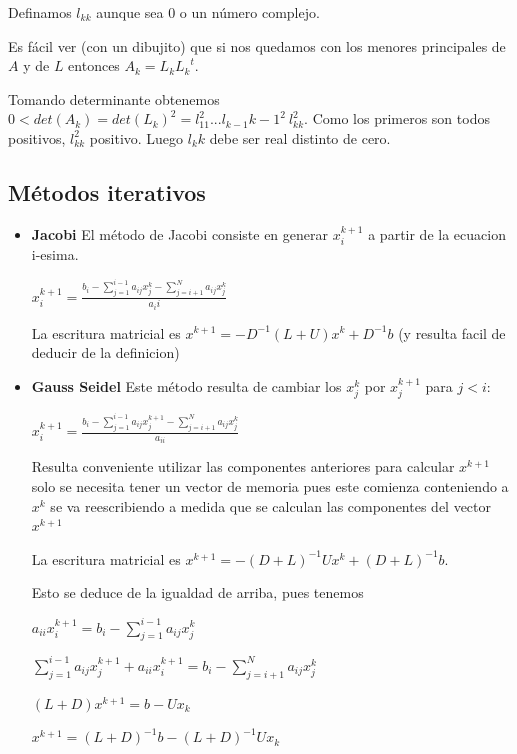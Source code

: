 \documentclass[10pt,a4paper,final]{report}
\begin{document}

Definamos $l_{kk}$ aunque sea $0$ o un número complejo.

Es fácil ver (con un dibujito) que si nos quedamos con los menores principales de $A$ y de $L$ entonces $A_k = L_k {L_k}^t$.


Tomando determinante obtenemos $0<det(A_k) = det(L_k)^2 = l_{11}^2...l_{k-1}{k-1}^2\ l_{kk}^2$. Como los primeros son todos positivos, $l_{kk}^2$ positivo. Luego $l_kk$ debe ser real distinto de cero.



\subsection{Métodos iterativos}


\begin{itemize}
    \item \textbf{Jacobi}
El método de Jacobi consiste en generar $x_{i}^{k+1}$ a partir de la ecuacion i-esima.


$x_i^{k+1} = \frac{b_i- \displaystyle \sum_{j=1}^{i-1}a_{ij}x_j^k - \displaystyle \sum_{j={i+1}}^{N}a_{ij}x_j^k }{a_ii}$

La escritura matricial es $x^{k+1}=-D^{-1}(L+U)x^k + D^{-1} b$ (y resulta facil de deducir de la definicion)

\item \textbf{Gauss Seidel} Este método resulta de cambiar los $x_j^k$ por $x_j^{k+1}$ para $j<i$:


$x_i^{k+1} = \frac{b_i- \displaystyle \sum_{j=1}^{i-1}a_{ij}x_j^{k+1} - \displaystyle \sum_{j={i+1}}^{N}a_{ij}x_j^{k} }{a_{ii}}$

Resulta conveniente utilizar las componentes anteriores para calcular $x^{k+1}$ solo se necesita tener un vector de memoria pues este comienza conteniendo a $x^{k}$ se va reescribiendo a medida que se calculan las componentes del vector $x^{k+1}$


La escritura matricial es $x^{k+1}=-(D+L)^{-1}Ux^k + (D+L)^{-1} b$.

Esto se deduce de la igualdad de arriba, pues tenemos 

$a_{ii} x_i^{k+1} = b_i- \displaystyle \sum_{j=1}^{i-1}a_{ij}x_j^k $

$\displaystyle \sum_{j=1}^{i-1}a_{ij}x_j^{k+1}
 + a_{ii} x_i^{k+1} = b_i- \displaystyle \sum_{j=i+1}^{N}a_{ij}x_j^k $
 
 $(L+D) x^{k+1} = b - U x_k$
 
 $x^{k+1} = (L+D)^{-1} b - (L+D)^{-1} U x_k$ 

\end{itemize}
\end{document}
